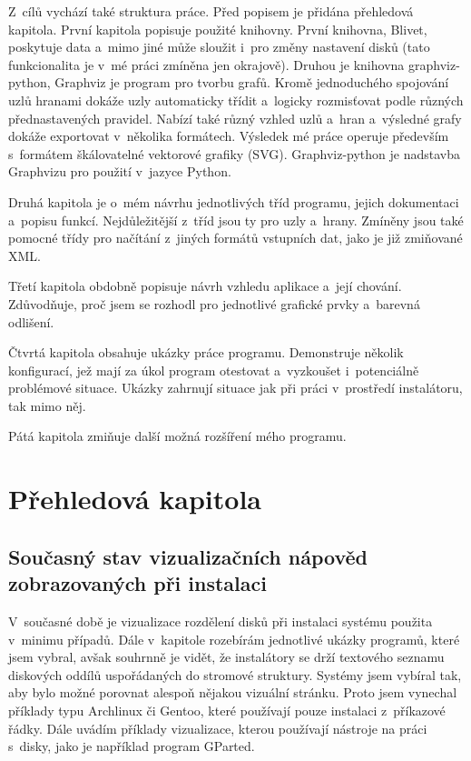 \documentclass[color,table,oneside,nolot,nolof]{fithesis}
\begin{document}
	Z~cílů vychází také struktura práce. Před popisem je přidána přehledová kapitola.
	První kapitola popisuje použité knihovny. První knihovna, Blivet\cite{blivet}, poskytuje data a~mimo jiné může sloužit i~pro změny 
	nastavení disků (tato funkcionalita je v~mé práci zmíněna jen okrajově). Druhou je knihovna graphviz-python\cite{graphviz-python}, Graphviz je program pro tvorbu grafů. Kromě
	jednoduchého spojování uzlů hranami dokáže uzly automaticky třídit a~logicky rozmisťovat podle různých přednastavených pravidel. Nabízí také různý vzhled uzlů
	a~hran a~výsledné grafy dokáže exportovat v~několika formátech. Výsledek mé práce operuje především s~formátem škálovatelné vektorové grafiky (SVG). Graphviz-python je 
	nadstavba Graphvizu pro použití v~jazyce Python.

	Druhá kapitola je o~mém návrhu jednotlivých tříd programu, jejich dokumentaci a~popisu funkcí. Nejdůležitější z~tříd jsou ty pro uzly a~hrany. Zmíněny jsou také pomocné třídy 
	pro načítání z~jiných formátů vstupních dat, jako je již zmiňované XML.

	Třetí kapitola obdobně popisuje návrh vzhledu aplikace a~její chování. Zdůvodňuje, proč jsem se rozhodl pro jednotlivé grafické prvky a~barevná odlišení.

	Čtvrtá kapitola obsahuje ukázky práce programu. Demonstruje několik konfigurací, jež mají za úkol program otestovat a~vyzkoušet i~potenciálně problémové situace. Ukázky  
	zahrnují situace jak při práci v~prostředí instalátoru, tak mimo něj.

	Pátá kapitola zmiňuje další možná rozšíření mého programu. 

\chapter{Přehledová kapitola}
\section{Současný stav vizualizačních nápověd zobrazovaných při instalaci}

V~současné době je vizualizace rozdělení disků při instalaci systému použita v~minimu případů. Dále v~kapitole rozebírám jednotlivé ukázky programů, které jsem vybral, avšak souhrnně je vidět, 
že instalátory se drží textového seznamu diskových oddílů uspořádaných do stromové struktury. Systémy jsem vybíral tak, aby bylo možné porovnat alespoň nějakou vizuální stránku. Proto jsem vynechal
příklady typu Archlinux či Gentoo, které používají pouze instalaci z~příkazové řádky.  Dále uvádím příklady vizualizace, kterou používají nástroje na práci s~disky, jako je 
například program GParted.
\end{document}
